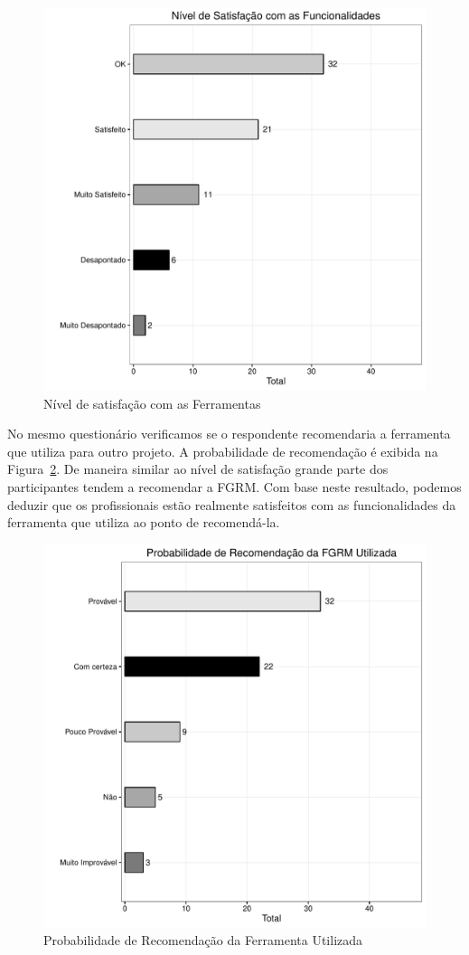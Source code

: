 \begin{figure}[htpb]
	\centering
	\includegraphics[width=0.8\linewidth]{./chapter-pesquisa-com-profissionais/img/grafico_melhorias_fgrm_nivel_satisfacao.pdf}
	\caption{Nível de satisfação com as Ferramentas}
\label{fig:grafico_melhorias_fgrm_nivel_satisfacao}
\end{figure}

No mesmo questionário verificamos se o respondente recomendaria a ferramenta que
utiliza para outro projeto. A probabilidade de recomendação é exibida na
Figura~\ref{fig:grafico_melhorias_fgrm_probabilidade_recomentacao}. De maneira
similar ao nível de satisfação grande parte dos participantes tendem a
recomendar a FGRM. Com base neste resultado, podemos deduzir que os
profissionais estão realmente satisfeitos com as funcionalidades da ferramenta
que utiliza ao ponto de recomendá-la.

\begin{figure}[htpb]
	\centering
	\includegraphics[width=0.8\linewidth]{./chapter-pesquisa-com-profissionais/img/grafico_melhorias_fgrm_probabilidade_recomentacao.pdf}
	\caption{Probabilidade de Recomendação da Ferramenta Utilizada}
\label{fig:grafico_melhorias_fgrm_probabilidade_recomentacao}
\end{figure}

